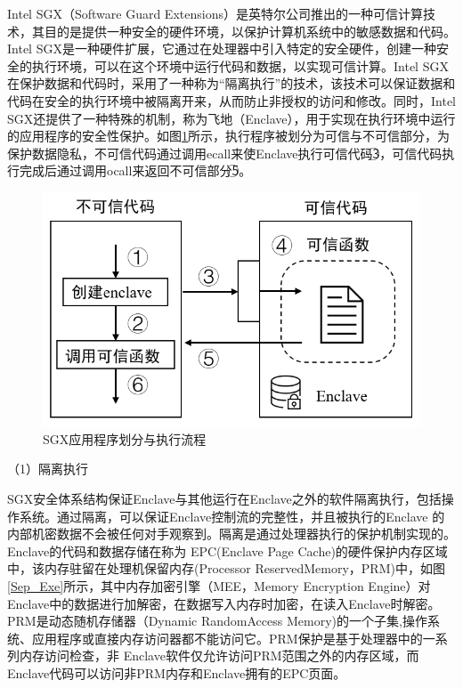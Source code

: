 
Intel SGX（Software Guard Extensions）是英特尔公司推出的一种可信计算技术，其目的是提供一种安全的硬件环境，以保护计算机系统中的敏感数据和代码。Intel SGX是一种硬件扩展，它通过在处理器中引入特定的安全硬件，创建一种安全的执行环境，可以在这个环境中运行代码和数据，以实现可信计算。Intel SGX在保护数据和代码时，采用了一种称为“隔离执行”的技术，该技术可以保证数据和代码在安全的执行环境中被隔离开来，从而防止非授权的访问和修改。同时，Intel SGX还提供了一种特殊的机制，称为飞地（Enclave），用于实现在执行环境中运行的应用程序的安全性保护。如图\ref{SGX_Program}所示，执行程序被划分为可信与不可信部分，为保护数据隐私，不可信代码通过调用ecall来使Enclave执行可信代码\textcircled{3}，可信代码执行完成后通过调用ocall来返回不可信部分\textcircled{5}。

\begin{figure}[h]
	\centering
	\includegraphics[width=0.6\linewidth]{figures/SGX_Program.png}
	\caption{SGX应用程序划分与执行流程}
	\label{SGX_Program}
\end{figure}

（1）隔离执行

SGX安全体系结构保证Enclave与其他运行在Enclave之外的软件隔离执行，包括操作系统。通过隔离，可以保证Enclave控制流的完整性，并且被执行的Enclave 的内部机密数据不会被任何对手观察到。隔离是通过处理器执行的保护机制实现的。Enclave的代码和数据存储在称为 EPC(Enclave Page Cache)的硬件保护内存区域中，该内存驻留在处理机保留内存(Processor ReservedMemory，PRM)中，如图\ref{Sep_Exe}所示，其中内存加密引擎（MEE，Memory Encryption Engine）对Enclave中的数据进行加解密，在数据写入内存时加密，在读入Enclave时解密。PRM是动态随机存储器（Dynamic RandomAccess Memory)的一个子集,操作系统、应用程序或直接内存访问器都不能访问它。PRM保护是基于处理器中的一系列内存访问检查，非 Enclave软件仅允许访问PRM范围之外的内存区域，而Enclave代码可以访问非PRM内存和Enclave拥有的EPC页面。

